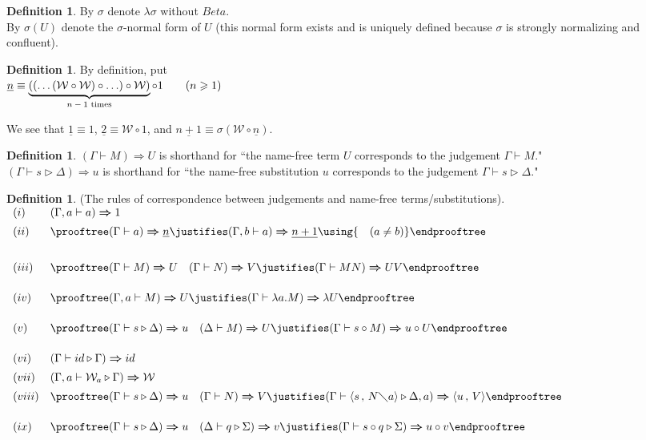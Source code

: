 \documentclass[11pt]{amsart}
\def\ruleone#1#2{\prooftree #1 \justifies #2 \endprooftree}
\def\ruletwo#1#2#3{\ruleone{#1\quad #2}{#3}}
\theoremstyle{plain}
\theoremstyle{definition}
\newtheorem{definition}[theorem]{Definition}
\theoremstyle{remark}
\numberwithin{equation}{section}
\newcommand{\tri}{\triangleright}
\newcommand{\ci}{\circ}
\newcommand{\mi}{\,,\,}
\newcommand{\is}{\diagdown}
\newcommand{\la}{\langle}
\newcommand{\x}{a}
\newcommand{\y}{b}
\renewcommand{\pi}{\mathcal{W}}
\begin{document}
\begin{definition}By $\sigma$ denote $\lambda\sigma$ without $Beta$.\\
By $\sigma(U)$ denote the $\sigma$-normal form of $U$ (this normal
form exists and is uniquely defined because $\sigma$ is strongly
normalizing and confluent).
\end{definition}
\begin{definition}By definition, put\\
$\underline{n}\equiv\underbrace{((\ldots(\pi\ci\pi)\ci\ldots)\ci\pi)}_{\mbox{\scriptsize
$n-1$ times}}\ci 1 \qquad(n\geqslant 1)$
\end{definition}
We see that $\underline{1}\equiv 1$, $\underline{2}\equiv\pi\ci
1$, and $\underline{n+1}\equiv\sigma(\pi\ci\underline{n})$.
\begin{definition} $(\Gamma\vdash
M)\boldsymbol{\Rightarrow} U$ is shorthand for ``the name-free
term
$U$ corresponds to the judgement $\Gamma\vdash M$."\\
$(\Gamma\vdash s\tri\Delta)\boldsymbol{\Rightarrow} u$ is
shorthand for ``the name-free
 substitution
$u$ corresponds to the
 judgement $\Gamma\vdash s\tri\Delta$."
\end{definition}
\begin{definition}\label{transfer}(The rules of correspondence between judgements and
name-free
terms/substitutions).\\[5pt]
 $
\begin{array}{ll}
(i)& (\Gamma,\x\vdash \x)\boldsymbol{\Rightarrow}  1 \\[5pt]
 (ii)& \ruleone{(\Gamma\vdash
\x)\boldsymbol{\Rightarrow}  \underline{n}}{(\Gamma,\y\vdash \x)\boldsymbol{\Rightarrow} \underline{n+1}\using {\quad(\x\neq \y)}}\\[20pt]
 (iii)& \ruletwo{(\Gamma\vdash M)\boldsymbol{\Rightarrow}  U}{(\Gamma\vdash N)\boldsymbol{\Rightarrow } V}{(\Gamma\vdash
MN)\boldsymbol{\Rightarrow}  UV}\\[15pt]
 (iv)& \ruleone{(\Gamma,\x\vdash M)\boldsymbol{\Rightarrow }  U}{(\Gamma\vdash\lambda \x.M)\boldsymbol{\Rightarrow}  \lambda U}\\[15pt]
 (v)& \ruletwo{(\Gamma\vdash s \tri\Delta)\boldsymbol{\Rightarrow}  u }{(\Delta\vdash M)\boldsymbol{\Rightarrow }  U}{(\Gamma\vdash
 s \ci M)\boldsymbol{\Rightarrow }  u \ci U}\\[15pt]
(vi)& (\Gamma\vdash id \tri\Gamma)\boldsymbol{\Rightarrow}  id  \\[5pt]
(vii)& (\Gamma,\x\vdash\pi_{\x} \tri\Gamma)\boldsymbol{\Rightarrow}   \pi  \\[5pt]
(viii)& \ruletwo{(\Gamma\vdash s
\tri\Delta)\boldsymbol{\Rightarrow}
 u  }{(\Gamma\vdash
N)\boldsymbol{\Rightarrow}  V}{(\Gamma\vdash
\langle s\mi N\is \x\rangle \tri\Delta ,\x)\boldsymbol{\Rightarrow} \la u\mi V\rangle }\\[15pt]
(ix)& \ruletwo{(\Gamma\vdash s \tri\Delta)\boldsymbol{\Rightarrow}
 u }{(\Delta\vdash q
\tri\Sigma)\boldsymbol{\Rightarrow}  v  }{(\Gamma \vdash s \ci q
\tri\Sigma)\boldsymbol{\Rightarrow}  u \ci v }\\[20pt]
\end{array}
$
\end{definition}
\end{document}
